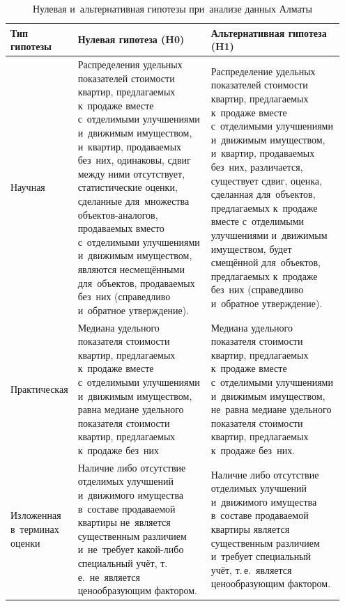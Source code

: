 \documentclass[]{scrreprt}
\begin{document}
\begin{table}[ht]
	\caption{Нулевая и~альтернативная гипотезы при~анализе данных Алматы}  \label{tab:nul-alt-hypothesis-almaty}
	\centering
	\begin{tabularx}{\textwidth}{p{0.15\linewidth} p{0.4\linewidth} p{0.4\linewidth}} 
		\hline
		Тип гипотезы&Нулевая гипотеза (H0)&Альтернативная гипотеза (H1)\\
		\hline
		Научная&Распределения удельных показателей стоимости квартир, предлагаемых к~продаже вместе с~отделимыми улучшениями и~движимым имуществом, и~квартир, продаваемых без~них, одинаковы, сдвиг между ними отсутствует, статистические оценки, сделанные для~множества объектов-аналогов, продаваемых вместо с~отделимыми улучшениями и~движимым имуществом, являются несмещёнными для~объектов, продаваемых без~них (справедливо и~обратное утверждение).&Распределение удельных показателей стоимости квартир, предлагаемых к~продаже вместе с~отделимыми улучшениями и~движимым имуществом, и~квартир, продаваемых без~них, различается, существует сдвиг, оценка, сделанная для~объектов, предлагаемых к~продаже вместе с~отделимыми улучшениями и~движимым имуществом, будет смещённой для~объектов, предлагаемых к~продаже без~них (справедливо и~обратное утверждение).\\
		\hline
		Практическая&Медиана удельного показателя стоимости квартир, предлагаемых к~продаже вместе с~отделимыми улучшениями и~движимым имуществом, равна медиане удельного показателя стоимости квартир, предлагаемых к~продаже без~них&Медиана удельного показателя стоимости квартир, предлагаемых к~продаже вместе с~отделимыми улучшениями и~движимым имуществом, не~равна медиане удельного показателя стоимости квартир, предлагаемых к~продаже без~них.\\
		\hline
		Изложенная в~терминах оценки&Наличие либо отсутствие отделимых улучшений и~движимого имущества в~составе продаваемой квартиры не~является существенным различием и~не~требует какой-либо специальный учёт, т.\,е.~не~является ценообразующим фактором.&Наличие либо отсутствие отделимых улучшений и~движимого имущества в~составе продаваемой квартиры является существенным различием и~требует специальный учёт, т.\,е.~является ценообразующим фактором.\\
		\hline
	\end{tabularx}
\end{table}
\end{document}

